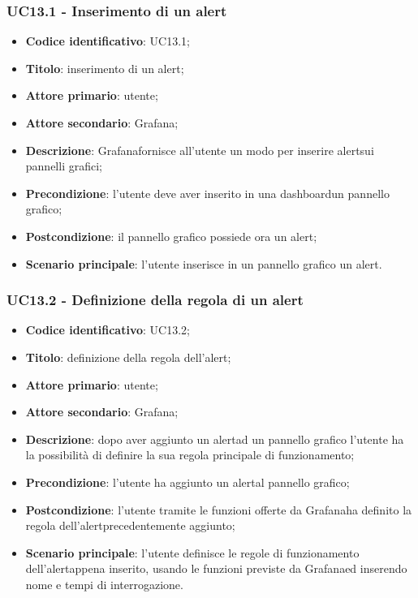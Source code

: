 \subsubsection{UC13.1 - Inserimento di un alert}
\begin{itemize}
	\item \textbf{Codice identificativo}: UC13.1;
	\item \textbf{Titolo}: inserimento di un alert\glo;
	\item \textbf{Attore primario}: utente;
	\item \textbf{Attore secondario}: Grafana\glo;
	\item \textbf{Descrizione}: Grafana\glosp fornisce all'utente un modo per inserire alert\glosp sui pannelli grafici;
	\item \textbf{Precondizione}: l'utente deve aver inserito in una dashboard\glosp un pannello grafico;
	\item \textbf{Postcondizione}: il pannello grafico possiede ora un alert\glo;
	\item \textbf{Scenario principale}: l'utente inserisce in un pannello grafico un alert\glo.
\end{itemize}

\subsubsection{UC13.2 - Definizione della regola di un alert}
\begin{itemize}
	\item \textbf{Codice identificativo}: UC13.2;
	\item \textbf{Titolo}: definizione della regola dell'alert\glo;
	\item \textbf{Attore primario}: utente;
	\item \textbf{Attore secondario}: Grafana\glo;
	\item \textbf{Descrizione}: dopo aver aggiunto un alert\glosp ad un pannello grafico l'utente ha la possibilità di definire la sua regola principale di funzionamento;
	\item \textbf{Precondizione}: l'utente ha aggiunto un alert\glosp al pannello grafico;
	\item \textbf{Postcondizione}: l'utente tramite le funzioni offerte da Grafana\glosp ha definito la regola dell'alert\glosp precedentemente aggiunto;
	\item \textbf{Scenario principale}: l'utente definisce le regole di funzionamento dell'alert\glosp appena inserito, usando le funzioni previste da Grafana\glosp ed inserendo nome e tempi di interrogazione.
\end{itemize}

